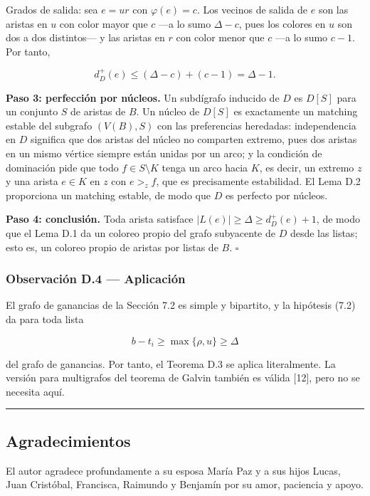 \documentclass[
  11pt,
]{article}
\begin{document}
Grados de salida: sea \(e=ur\) con \(\varphi(e)=c\). Los vecinos de
salida de \(e\) son las aristas en \(u\) con color mayor que \(c\) ---a
lo sumo \(\Delta-c\), pues los colores en \(u\) son dos a dos
distintos--- y las aristas en \(r\) con color menor que \(c\) ---a lo
sumo \(c-1\). Por tanto,

\[
d^+_D(e)\le(\Delta-c)+(c-1)=\Delta-1.
\]

\textbf{Paso 3: perfección por núcleos.} Un subdígrafo inducido de \(D\)
es \(D[S]\) para un conjunto \(S\) de aristas de \(B\). Un núcleo de
\(D[S]\) es exactamente un matching estable del subgrafo \((V(B),S)\)
con las preferencias heredadas: independencia en \(D\) significa que dos
aristas del núcleo no comparten extremo, pues dos aristas en un mismo
vértice siempre están unidas por un arco; y la condición de dominación
pide que todo \(f\in S\setminus K\) tenga un arco hacia \(K\), es decir,
un extremo \(z\) y una arista \(e\in K\) en \(z\) con \(e>_zf\), que es
precisamente estabilidad. El Lema D.2 proporciona un matching estable,
de modo que \(D\) es perfecto por núcleos.

\textbf{Paso 4: conclusión.} Toda arista satisface
\(|L(e)|\ge\Delta\ge d^+_D(e)+1\), de modo que el Lema D.1 da un coloreo
propio del grafo subyacente de \(D\) desde las listas; esto es, un
coloreo propio de aristas por listas de \(B\). \(\square\)

\subsubsection{Observación D.4 ---
Aplicación}\label{observaciuxf3n-d.4-aplicaciuxf3n}

El grafo de ganancias de la Sección 7.2 es simple y bipartito, y la
hipótesis (7.2) da para toda lista

\[
b-t_i\ge\max\{\rho,u\}\ge\Delta
\]

del grafo de ganancias. Por tanto, el Teorema D.3 se aplica
literalmente. La versión para multigrafos del teorema de Galvin también
es válida {[}12{]}, pero no se necesita aquí.

\begin{center}\rule{0.5\linewidth}{0.5pt}\end{center}

\subsection{Agradecimientos}\label{agradecimientos}

El autor agradece profundamente a su esposa María Paz y a sus hijos
Lucas, Juan Cristóbal, Francisca, Raimundo y Benjamín por su amor,
paciencia y apoyo.
\end{document}
